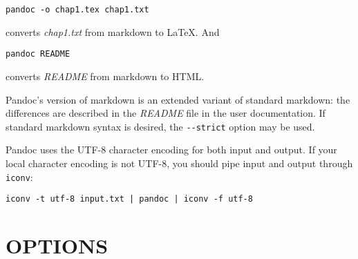 \documentclass[
  12pt,
  a4paper,
]{article}
\begin{document}
\begin{verbatim}
pandoc -o chap1.tex chap1.txt
\end{verbatim}

converts \emph{chap1.txt} from markdown to LaTeX. And

\begin{verbatim}
pandoc README
\end{verbatim}

converts \emph{README} from markdown to HTML.

Pandoc's version of markdown is an extended variant of standard markdown: the
differences are described in the \emph{README} file in the user documentation.
If standard markdown syntax is desired, the \texttt{-\/-strict} option may be
used.

Pandoc uses the UTF-8 character encoding for both input and output. If your
local character encoding is not UTF-8, you should pipe input and output
through \texttt{iconv}:

\begin{verbatim}
iconv -t utf-8 input.txt | pandoc | iconv -f utf-8
\end{verbatim}

\hypertarget{options}{%
\section{OPTIONS}\label{options}}
\end{document}
